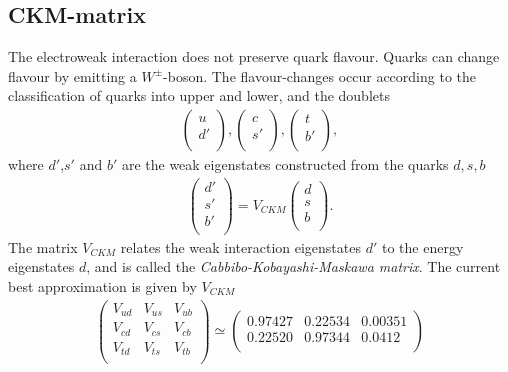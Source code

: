 \documentclass[11pt]{article}
\begin{document}
\begin{multicols}{2}
\subsection*{CKM-matrix}
\begin{flushleft}
The electroweak interaction does not preserve quark flavour. Quarks can change flavour by emitting a $W^{\pm}$-boson. The flavour-changes occur according to the classification of quarks into upper and lower, and the doublets
\begin{align*}
\begin{pmatrix}
u\\
d'\\
\end{pmatrix},
\begin{pmatrix}
c\\
s'\\
\end{pmatrix},
\begin{pmatrix}
t\\
b'\\
\end{pmatrix},
\end{align*}
where $d'$,$s'$ and $b'$ are the weak eigenstates constructed from the quarks $d,s,b$
\begin{align*}
\begin{pmatrix}
d'\\
s'\\
b'\\
\end{pmatrix} = 
V_{CKM} \begin{pmatrix}
d\\
s\\
b\\
\end{pmatrix}.
\end{align*}
The matrix $V_{CKM}$ relates the weak interaction eigenstates $d'$ to the energy eigenstates $d$, and is called the \textit{Cabbibo-Kobayashi-Maskawa matrix}. The current best approximation is given by $V_{CKM}$
\begin{align*}
\begin{pmatrix}
V_{ud} & V_{us} & V_{ub}\\
V_{cd} & V_{cs} & V_{cb}\\
V_{td} & V_{ts} & V_{tb}\\
\end{pmatrix}
\simeq \begin{pmatrix}
0.97427 & 0.22534 & 0.00351 \\
0.22520 & 0.97344 & 0.0412 \\

\end{pmatrix}
\end{align*}
\end{flushleft}
\end{multicols}
\end{document}
